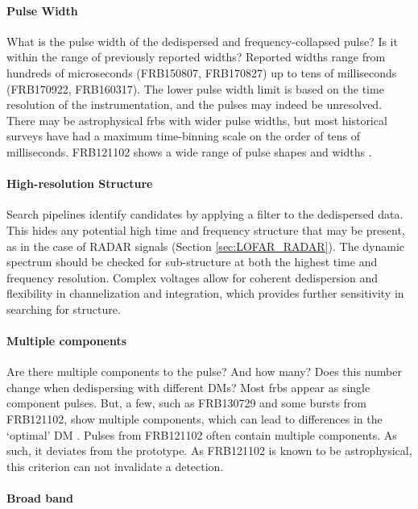 \documentclass[a4paper,fleqn,usenatbib]{mnras}
\begin{document}
\paragraph{Pulse Width}

What is the pulse width of the dedispersed and frequency-collapsed pulse? Is it
within the range of previously reported widths? Reported widths range from
hundreds of microseconds (FRB150807, FRB170827) up to tens of milliseconds
(FRB170922, FRB160317). The lower pulse width limit is based on the time
resolution of the instrumentation, and the pulses may indeed be unresolved.
There may be astrophysical \glspl{frb} with wider pulse widths, but most
historical surveys have had a maximum time-binning scale on the order of tens of
milliseconds. FRB121102 shows a wide range of pulse shapes and widths
\citep{2018Natur.553..182M,atel10675}.

\paragraph{High-resolution Structure}

Search pipelines identify candidates by applying a filter to the dedispersed
data. This hides any potential high time and frequency structure that may be
present, as in the case of RADAR signals (Section \ref{sec:LOFAR_RADAR}). The
dynamic spectrum should be checked for sub-structure at both the highest time
and frequency resolution. Complex voltages allow for coherent dedispersion and
flexibility in channelization and integration, which provides further
sensitivity in searching for structure.

\paragraph{Multiple components}

Are there multiple components to the pulse? And how many? Does this number
change when dedispersing with different DMs? Most \glspl{frb} appear as single
component pulses. But, a few, such as FRB130729 and some bursts from FRB121102,
show multiple components, which can lead to differences in the `optimal' DM
\citep{2018Natur.553..182M}. Pulses from FRB121102 often contain multiple
components. As such, it deviates from the prototype. As FRB121102 is known to
be astrophysical, this criterion can not invalidate a detection.

\paragraph{Broad band}
\end{document}
